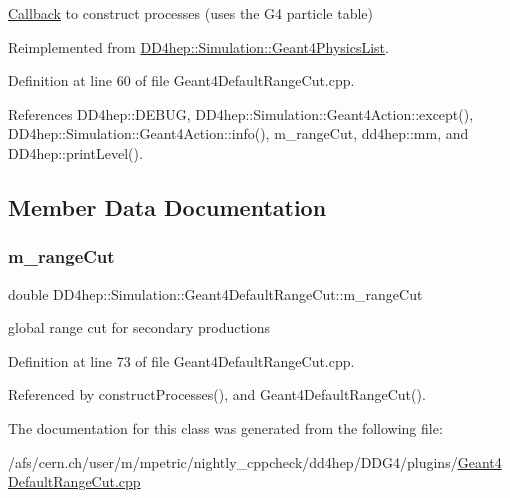 \hyperlink{class_d_d4hep_1_1_callback}{Callback} to construct processes (uses the G4 particle table) 



Reimplemented from \hyperlink{class_d_d4hep_1_1_simulation_1_1_geant4_physics_list_ae769a12f86a3cb785c1e040c5a32d8fb}{D\+D4hep\+::\+Simulation\+::\+Geant4\+Physics\+List}.



Definition at line 60 of file Geant4\+Default\+Range\+Cut.\+cpp.



References D\+D4hep\+::\+D\+E\+B\+UG, D\+D4hep\+::\+Simulation\+::\+Geant4\+Action\+::except(), D\+D4hep\+::\+Simulation\+::\+Geant4\+Action\+::info(), m\+\_\+range\+Cut, dd4hep\+::mm, and D\+D4hep\+::print\+Level().



\subsection{Member Data Documentation}
\hypertarget{class_d_d4hep_1_1_simulation_1_1_geant4_default_range_cut_a3a03ddf8f442cefe710b25930bd07f50}{}\label{class_d_d4hep_1_1_simulation_1_1_geant4_default_range_cut_a3a03ddf8f442cefe710b25930bd07f50} 
\subsubsection{\texorpdfstring{m\+\_\+range\+Cut}{m\_rangeCut}}
{\footnotesize\ttfamily double D\+D4hep\+::\+Simulation\+::\+Geant4\+Default\+Range\+Cut\+::m\+\_\+range\+Cut\hspace{0.3cm}{\ttfamily [private]}}



global range cut for secondary productions 



Definition at line 73 of file Geant4\+Default\+Range\+Cut.\+cpp.



Referenced by construct\+Processes(), and Geant4\+Default\+Range\+Cut().



The documentation for this class was generated from the following file\+:\begin{DoxyCompactItemize}
\item 
/afs/cern.\+ch/user/m/mpetric/nightly\+\_\+cppcheck/dd4hep/\+D\+D\+G4/plugins/\hyperlink{_geant4_default_range_cut_8cpp}{Geant4\+Default\+Range\+Cut.\+cpp}\end{DoxyCompactItemize}
